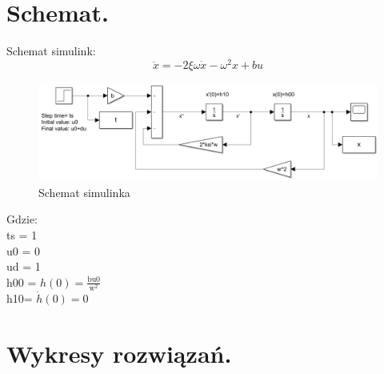 \documentclass{article}
\begin{document}
\section{Schemat.}
Schemat simulink:\\
$$
\ddot{x}=-2\xi \omega \dot{x}-\omega^{2}x+bu
$$
 \begin{figure}[h!]
    \centering
    \includegraphics[scale=0.55]{schemat_poprawa.png}
    \caption{Schemat simulinka}
    \label{fig:schemat}
 \end{figure}
 \begin{flushleft}
 Gdzie:\\
 ts = 1\\
u0  = 0\\
ud = 1\\
h00 = $h(0)=\frac{\text{bu0}}{\text{w}^2}$\\
h10= $\dot{h}(0)=0$
 \end{flushleft}
\newpage
\section{Wykresy rozwiązań.}
\end{document}

